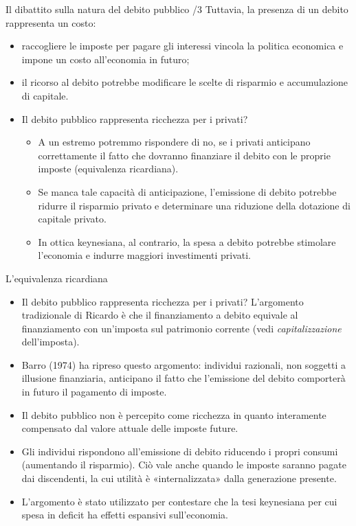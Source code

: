 \documentclass[aspectratio=149,11pt,italian]{beamer}
\begin{document}
\begin{frame}{Il dibattito sulla natura del debito pubblico /3}
Tuttavia, la presenza di un debito rappresenta un costo:
\begin{itemize}
\item raccogliere le imposte per pagare gli interessi vincola la politica
economica e impone un costo all'economia in futuro;
\item il ricorso al debito potrebbe modificare le scelte di risparmio e
accumulazione di capitale.
\item Il debito pubblico rappresenta ricchezza per i privati?
\begin{itemize}
\item A un estremo potremmo rispondere di no, se i privati anticipano
correttamente il fatto che dovranno finanziare il debito con le proprie
imposte (equivalenza ricardiana).
\item Se manca tale capacità di anticipazione, l'emissione di debito potrebbe
ridurre il risparmio privato e determinare una riduzione della dotazione
di capitale privato.
\item In ottica keynesiana, al contrario, la spesa a debito potrebbe stimolare
l'economia e indurre maggiori investimenti privati.
\end{itemize}
\end{itemize}
\end{frame}

\begin{frame}{L'equivalenza ricardiana}
\begin{itemize}
\item Il debito pubblico rappresenta ricchezza per i privati? L'argomento
tradizionale di Ricardo è che il finanziamento a debito equivale al
finanziamento con un'imposta sul patrimonio corrente (vedi
\emph{capitalizzazione} dell'imposta).
\item Barro (1974) ha ripreso questo argomento: individui razionali, non soggetti
a illusione finanziaria, anticipano il fatto che l'emissione del debito
comporterà in futuro il pagamento di imposte.
\item Il debito pubblico non è percepito come ricchezza in quanto interamente
compensato dal valore attuale delle imposte future.
\item Gli individui rispondono all'emissione di debito riducendo i propri consumi
(aumentando il risparmio). Ciò vale anche quando le imposte saranno pagate
dai discendenti, la cui utilità è «internalizzata» dalla generazione
presente.
\item L'argomento è stato utilizzato per contestare che la tesi keynesiana per cui
spesa in deficit ha effetti espansivi sull'economia.
\end{itemize}
\end{frame}
\end{document}
